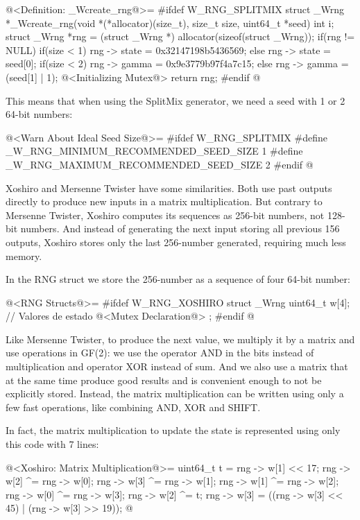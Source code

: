 \iniciocodigo
@<Definition: \_Wcreate\_rng@>=
#ifdef W_RNG_SPLITMIX
struct _Wrng *_Wcreate_rng(void *(*allocator)(size_t), size_t size,
                           uint64_t *seed){
  int i;
  struct _Wrng *rng = (struct _Wrng *) allocator(sizeof(struct _Wrng));
  if(rng != NULL){
    if(size < 1)
      rng -> state = 0x32147198b5436569;
    else
      rng -> state = seed[0];
    if(size < 2)
      rng -> gamma = 0x9e3779b97f4a7c15;
    else
      rng -> gamma = (seed[1] | 1);
    @<Initializing Mutex@>
  }
  return rng;
}
#endif
@
\fimcodigo

This means that when using the SplitMix generator, we need a seed with
1 or 2 64-bit numbers:

\iniciocodigo
@<Warn About Ideal Seed Size@>=
#ifdef W_RNG_SPLITMIX
#define _W_RNG_MINIMUM_RECOMMENDED_SEED_SIZE  1
#define _W_RNG_MAXIMUM_RECOMMENDED_SEED_SIZE  2
#endif
@
\fimcodigo



Xoshiro and Mersenne Twister have some similarities. Both use past
outputs directly to produce new inputs in a matrix multiplication. But
contrary to Mersenne Twister, Xoshiro computes its sequences as
256-bit numbers, not 128-bit numbers. And instead of generating the
next input storing all previous 156 outputs, Xoshiro stores only the
last 256-number generated, requiring much less memory.

In the RNG struct we store the 256-number as a sequence of four 64-bit
number:

\iniciocodigo
@<RNG Structs@>=
#ifdef W_RNG_XOSHIRO
struct _Wrng{
  uint64_t w[4];   // Valores de estado
  @<Mutex Declaration@>
};
#endif
@
\fimcodigo

Like Mersenne Twister, to produce the next value, we multiply it by a
matrix and use operations in GF(2): we use the operator AND in the
bits instead of multiplication and operator XOR instead of sum. And we
also use a matrix that at the same time produce good results and is
convenient enough to not be explicitly stored. Instead, the matrix
multiplication can be written using only a few fast operations, like
combining AND, XOR and SHIFT.

In fact, the matrix multiplication to update the state is represented
using only this code with 7 lines:

\iniciocodigo
@<Xoshiro: Matrix Multiplication@>=
{
  uint64_t t = rng -> w[1] << 17;
  rng -> w[2] ^= rng -> w[0];
  rng -> w[3] ^= rng -> w[1];
  rng -> w[1] ^= rng -> w[2];
  rng -> w[0] ^= rng -> w[3];
  rng -> w[2] ^= t;
  rng -> w[3] = ((rng -> w[3] << 45) | (rng -> w[3] >> 19));
}
@
\fimcodigo

